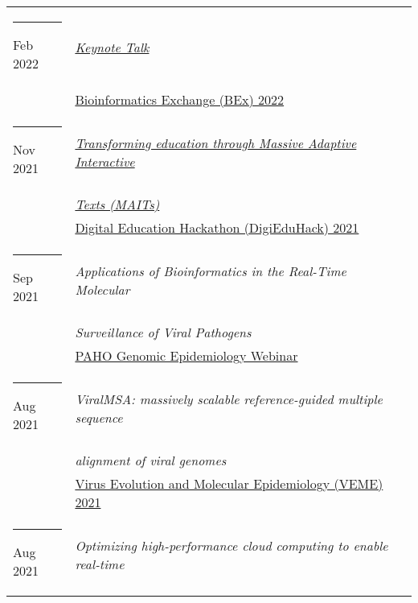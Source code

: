 \documentclass[margin,line]{res}
\begin{document}
\begin{resume}
\begin{longtable}{@{}p{0.7in}p{4in}}
\hspace*{-4mm} \rule{-1mm}{5mm} Feb 2022 & \href{https://bioinformatics.ucsd.edu/node/138}{\textit{Keynote Talk}}\\*
\hspace*{-4mm} & \hspace{4mm} \href{https://bioinformatics.ucsd.edu/node/138}{Bioinformatics Exchange (BEx) 2022}\\
\hspace*{-4mm} \rule{-1mm}{5mm} Nov 2021 & \href{https://www.youtube.com/watch?v=EPU_nv-yb_w&t=8206s}{\textit{Transforming education through Massive Adaptive Interactive}}\\*
\hspace*{-4mm} & \hspace{4mm} \href{https://www.youtube.com/watch?v=EPU_nv-yb_w&t=8206s}{\textit{Texts (MAITs)}}\\*
\hspace*{-4mm} & \hspace{4mm} \href{https://digieduhack.com/}{Digital Education Hackathon (DigiEduHack) 2021}\\
\hspace*{-4mm} \rule{-1mm}{5mm} Sep 2021 & \textit{Applications of Bioinformatics in the Real-Time Molecular}\\*
\hspace*{-4mm} & \hspace{4mm} \textit{Surveillance of Viral Pathogens}\\*
\hspace*{-4mm} & \hspace{4mm} \href{https://www.paho.org/}{PAHO Genomic Epidemiology Webinar}\\
\hspace*{-4mm} \rule{-1mm}{5mm} Aug 2021 & \textit{ViralMSA: massively scalable reference-guided multiple sequence}\\*
\hspace*{-4mm} & \hspace{4mm} \textit{alignment of viral genomes}\\*
\hspace*{-4mm} & \hspace{4mm} \href{https://rega.kuleuven.be/cev/veme-workshop/2021}{Virus Evolution and Molecular Epidemiology (VEME) 2021}\\
\hspace*{-4mm} \rule{-1mm}{5mm} Aug 2021 & \textit{Optimizing high-performance cloud computing to enable real-time}\\*

\end{longtable}
\end{resume}
\end{document}
